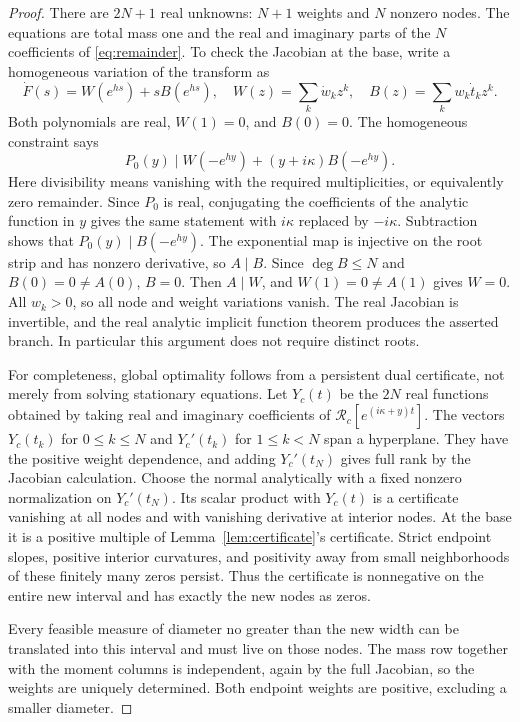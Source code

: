 \documentclass[11pt]{article}
\theoremstyle{remark}\newtheorem{remark}[theorem]{Remark}
\begin{document}
\begin{proof}
There are $2N+1$ real unknowns: $N+1$ weights and $N$ nonzero nodes. The
equations are total mass one and the real and imaginary parts of the $N$
coefficients of \eqref{eq:remainder}. To check the Jacobian at the base,
write a homogeneous variation of the transform as
\[
 \dot F(s)=W(e^{hs})+sB(e^{hs}),\quad
 W(z)=\sum_k\dot w_kz^k,\quad B(z)=\sum_kw_k\dot t_kz^k.
\]
Both polynomials are real, $W(1)=0$, and $B(0)=0$. The homogeneous
constraint says
\[
 P_0(y)\mid W(-e^{hy})+(y+i\kappa)B(-e^{hy}).
\]
Here divisibility means vanishing with the required multiplicities, or
equivalently zero remainder. Since $P_0$ is real, conjugating the
coefficients of the analytic function in $y$ gives the same statement with
$i\kappa$ replaced by $-i\kappa$. Subtraction shows that
$P_0(y)\mid B(-e^{hy})$. The exponential map is injective on the root strip
and has nonzero derivative, so $A\mid B$. Since $\deg B\le N$ and
$B(0)=0\ne A(0)$, $B=0$. Then $A\mid W$, and $W(1)=0\ne A(1)$ gives
$W=0$. All $w_k>0$, so all node and weight variations vanish. The real
Jacobian is invertible, and the real analytic implicit function theorem
produces the asserted branch. In particular this argument does not require
distinct roots.

For completeness, global optimality follows from a persistent dual
certificate, not merely from solving stationary equations. Let $Y_c(t)$
be the $2N$ real functions obtained by taking real and imaginary
coefficients of $\mathcal R_c[e^{(i\kappa+y)t}]$. The vectors
$Y_c(t_k)$ for $0\le k\le N$ and $Y_c'(t_k)$ for $1\le k<N$ span a
hyperplane. They have the positive weight dependence, and adding
$Y_c'(t_N)$ gives full rank by the Jacobian calculation. Choose the normal
analytically with a fixed nonzero normalization on $Y_c'(t_N)$.
Its scalar product with $Y_c(t)$ is a certificate vanishing at all nodes
and with vanishing derivative at interior nodes. At the base it is a
positive multiple of Lemma~\ref{lem:certificate}'s certificate. Strict
endpoint slopes, positive interior curvatures, and positivity away from
small neighborhoods of these finitely many zeros persist. Thus the
certificate is nonnegative on the entire new interval and has exactly
the new nodes as zeros.

Every feasible measure of diameter no greater than the new width can be
translated into this interval and must live on those nodes. The mass row
together with the moment columns is independent, again by the full
Jacobian, so the weights are uniquely determined. Both endpoint weights
are positive, excluding a smaller diameter.
\end{proof}
\end{document}
